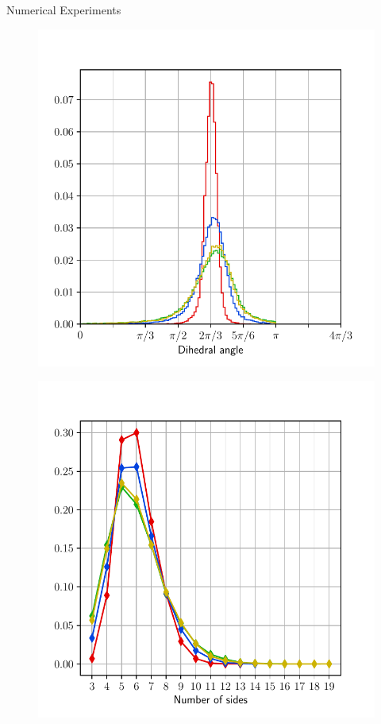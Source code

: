 \documentclass[usenames,dvipsnames]{beamer}
\begin{document}
\begin{frame}{Numerical Experiments}
\vspace{-0.5em}
\begin{minipage}{0.5\textwidth}
\begin{figure}
    \includegraphics[trim={0 1em 0 3em},clip=true,scale=0.35]{figures/coupled_model/new_data/ang.pdf}
\end{figure}
\end{minipage}%
\begin{minipage}{0.5\textwidth}
\begin{figure}
    \includegraphics[trim={0 1em 0 3em},clip=true,scale=0.35]{figures/coupled_model/new_data/nsides.pdf}

\end{figure}
\end{minipage}
\end{frame}
\end{document}
